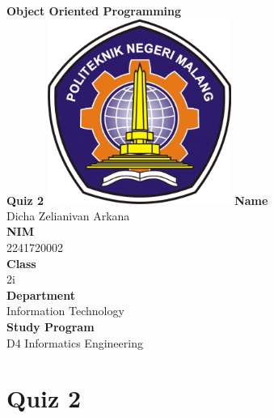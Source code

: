 \documentclass[12pt,titlepage]{article}
\newcommand{\vSubject}{Object Oriented Programming}
\newcommand{\vSubtitle}{Quiz 2}
\newcommand{\vName}{Dicha Zelianivan Arkana}
\newcommand{\vNIM}{2241720002}
\newcommand{\vClass}{2i}
\newcommand{\vDepartment}{Information Technology}
\newcommand{\vStudyProgram}{D4 Informatics Engineering}
\begin{document}
\begin{titlepage}
    \centering
    \vfill
    {\bfseries\LARGE
        \vSubject\\
        \vskip0.25cm
        \vSubtitle
    }
    \vfill
    \includegraphics[width=6cm]{images/polinema-logo.png}
    \vfill
    {
        \textbf{Name}\\
        \vName\\
        \vskip0.5cm
        \textbf{NIM}\\
        \vNIM\\
        \vskip0.5cm
        \textbf{Class}\\
        \vClass\\
        \vskip0.5cm
        \textbf{Department}\\
        \vDepartment\\
        \vskip0.5cm
        \textbf{Study Program}\\
        \vStudyProgram
    }
\end{titlepage}

\section{Quiz 2}
\end{document}
